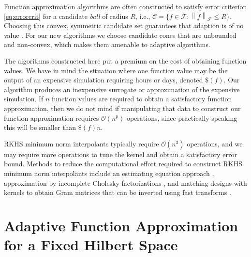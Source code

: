 \documentclass[]{mcom-l}
\theoremstyle{theorem}
\theoremstyle{remark}
\newcommand{\cc}{\mathcal{C}}
\newcommand{\calf}{{\mathcal{F}}}
\newcommand{\norm}[2][{}]{\ensuremath{\left \lVert #2 \right \rVert}_{#1}}
\newcommand{\Order}{\mathcal{O}}
\begin{document}
Function approximation algorithms are often constructed to satisfy error criterion \eqref{eq:errorcrit} for a candidate \emph{ball} of radius $R$, i.e., $\cc = \{f \in \calf : \norm[\calf]{f} \le R\}$.  Choosing this convex, symmetric candidate set guarantees that adaption is of no value \cite{Bak71}.  For our new algorithms we choose candidate cones that are unbounded and non-convex, which makes them amenable to adaptive algorithms.

The algorithms constructed here put a premium on the cost of obtaining function values.  We have in mind the situation where one function value may be the output of an expensive simulation requiring hours or days, denoted $\$(f)$.  Our algorithm produces an inexpensive surrogate or approximation of the expensive simulation.  If $n$ function values are required to obtain a satisfactory function approximation, then we do not mind if manipulating that data to construct our function approximation requires $\Order(n^p)$ operations, since practically speaking this will be smaller than $\$(f) n$.  

RKHS minimum  norm interpolants typically require $\Order(n^3)$ operations, and we may require more operations to tune the kernel and obtain a satisfactory error bound.  Methods to reduce the computational effort required to construct RKHS minimum norm interpolants include an estimating equation approach \cite{AniCheSte16a}, approximation by incomplete Cholesky factorizations \cite{OwhEtal19a}, and matching designs with kernels to obtain Gram matrices that can be inverted using fast transforms \cite{RatHic19a}.


\section{Adaptive Function Approximation for a Fixed Hilbert Space} \label{sec:fixedF}

\end{document}
